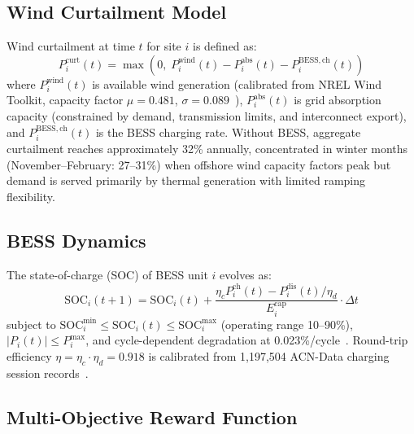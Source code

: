 \documentclass[journal]{IEEEtran}
\begin{document}
\subsection{Wind Curtailment Model}

Wind curtailment at time $t$ for site $i$ is defined as:
\begin{equation}
  P_i^{\mathrm{curt}}(t) = \max\!\left(0,\;
    P_i^{\mathrm{wind}}(t) - P_i^{\mathrm{abs}}(t) -
    P_i^{\mathrm{BESS,ch}}(t)\right)
  \label{eq:curtailment}
\end{equation}
where $P_i^{\mathrm{wind}}(t)$ is available wind generation (calibrated
from NREL Wind Toolkit, capacity factor $\mu = 0.481$,
$\sigma = 0.089$~\cite{draxl2015wind}), $P_i^{\mathrm{abs}}(t)$ is
grid absorption capacity (constrained by demand, transmission limits,
and interconnect export), and $P_i^{\mathrm{BESS,ch}}(t)$ is the BESS
charging rate. Without BESS, aggregate curtailment reaches approximately
32\% annually, concentrated in winter months (November--February:
27--31\%) when offshore wind capacity factors peak but demand is served
primarily by thermal generation with limited ramping flexibility.

\subsection{BESS Dynamics}

The state-of-charge (SOC) of BESS unit $i$ evolves as:
\begin{equation}
  \mathrm{SOC}_i(t{+}1) = \mathrm{SOC}_i(t) +
  \frac{\eta_c P_i^{\mathrm{ch}}(t) -
        P_i^{\mathrm{dis}}(t)/\eta_d}{E_i^{\mathrm{cap}}} \cdot \Delta t
  \label{eq:soc}
\end{equation}
subject to $\mathrm{SOC}_i^{\min} \leq \mathrm{SOC}_i(t) \leq
\mathrm{SOC}_i^{\max}$ (operating range 10--90\%),
$|P_i(t)| \leq P_i^{\max}$, and cycle-dependent degradation at
0.023\%/cycle~\cite{lee2019acn}. Round-trip efficiency
$\eta = \eta_c \cdot \eta_d = 0.918$ is calibrated from 1,197,504
ACN-Data charging session records~\cite{lee2019acn}.

\subsection{Multi-Objective Reward Function}
\end{document}
